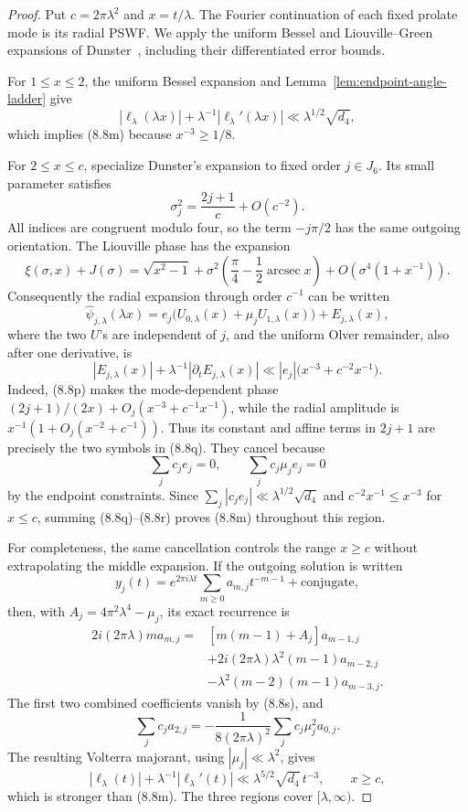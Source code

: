 \documentclass[11pt]{amsart}
\theoremstyle{definition}
\theoremstyle{remark}
\begin{document}
\begin{proof}
Put \(c=2\pi\lambda^2\) and \(x=t/\lambda\).  The Fourier continuation
of each fixed prolate mode is its radial PSWF.  We apply the uniform Bessel
and Liouville--Green expansions of Dunster~\cite{DunsterPSWF}, including
their differentiated error bounds.

For \(1\le x\le2\), the uniform Bessel expansion and
Lemma~\ref{lem:endpoint-angle-ladder} give
\[
 |\ell_\lambda(\lambda x)|+
 \lambda^{-1}|\ell_\lambda'(\lambda x)|
 \ll\lambda^{1/2}\sqrt{d_4},
\tag{8.8n}
\]
which implies (8.8m) because \(x^{-3}\ge1/8\).

For \(2\le x\le c\), specialize Dunster's expansion to fixed order
\(j\in J_6\).  Its small parameter satisfies
\[
 \sigma_j^2=\frac{2j+1}{c}+O(c^{-2}).
\tag{8.8o}
\]
All indices are congruent modulo four, so the term \(-j\pi/2\) has the
same outgoing orientation.  The Liouville phase has the expansion
\[
 \xi(\sigma,x)+J(\sigma)
 =\sqrt{x^2-1}
 +\sigma^2\left(\frac\pi4-\frac12\operatorname {arcsec}x\right)
 +O\!\left(\sigma^4(1+x^{-1})\right).
\tag{8.8p}
\]
Consequently the radial expansion through order \(c^{-1}\) can be written
\[
 \widehat\psi_{j,\lambda}(\lambda x)
 =e_j\bigl(U_{0,\lambda}(x)+\mu_jU_{1,\lambda}(x)\bigr)
 +E_{j,\lambda}(x),
\tag{8.8q}
\]
where the two \(U\)'s are independent of \(j\), and the uniform Olver
remainder, also after one derivative, is
\[
 |E_{j,\lambda}(x)|+
 \lambda^{-1}|\partial_tE_{j,\lambda}(x)|
 \ll |e_j|\bigl(x^{-3}+c^{-2}x^{-1}\bigr).
\tag{8.8r}
\]
Indeed, (8.8p) makes the mode-dependent phase
\((2j+1)/(2x)+O_j(x^{-3}+c^{-1}x^{-1})\), while the radial amplitude is
\(x^{-1}(1+O_j(x^{-2}+c^{-1}))\).  Thus its constant and affine terms in
\(2j+1\) are precisely the two symbols in (8.8q).  They cancel because
\[
 \sum_jc_je_j=0,
 \qquad
 \sum_jc_j\mu_je_j=0
\tag{8.8s}
\]
by the endpoint constraints.  Since
\(\sum_j|c_je_j|\ll\lambda^{1/2}\sqrt{d_4}\) and
\(c^{-2}x^{-1}\le x^{-3}\) for \(x\le c\), summing (8.8q)--(8.8r)
proves (8.8m) throughout this region.

For completeness, the same cancellation controls the range \(x\ge c\)
without extrapolating the middle expansion.  If the outgoing solution is
written
\[
 y_j(t)=e^{2\pi i\lambda t}
 \sum_{m\ge0}a_{m,j}t^{-m-1}+\text{conjugate},
\]
then, with \(A_j=4\pi^2\lambda^4-\mu_j\), its exact recurrence is
\[
 \begin{aligned}
 2i(2\pi\lambda)m a_{m,j}
 ={}&[m(m-1)+A_j]a_{m-1,j}\\
 &+2i(2\pi\lambda)\lambda^2(m-1)a_{m-2,j}\\
 &-\lambda^2(m-2)(m-1)a_{m-3,j}.
 \end{aligned}
\tag{8.8t}
\]
The first two combined coefficients vanish by (8.8s), and
\[
 \sum_jc_ja_{2,j}
 =-\frac1{8(2\pi\lambda)^2}
   \sum_jc_j\mu_j^2a_{0,j}.
\tag{8.8u}
\]
The resulting Volterra majorant, using \(|\mu_j|\ll\lambda^2\), gives
\[
 |\ell_\lambda(t)|+\lambda^{-1}|\ell_\lambda'(t)|
 \ll\lambda^{5/2}\sqrt{d_4}\,t^{-3},
 \qquad x\ge c,
\tag{8.8v}
\]
which is stronger than (8.8m).  The three regions cover
\([\lambda,\infty)\).
\end{proof}
\end{document}
